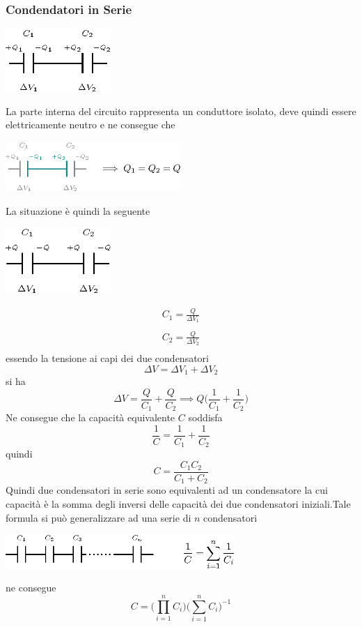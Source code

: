 \documentclass[10pt, letterpaper]{report}
\begin{document}
\subsubsection{Condendatori in Serie}
\begin{center}
    \includegraphics[width=0.3\textwidth]{images/condensatoreSerie1.eps}
\end{center} 
La parte interna del circuito rappresenta un conduttore isolato, deve quindi essere elettricamente neutro e ne consegue che 
\begin{center}
    \includegraphics[width=0.5\textwidth]{images/condensatoreSerie2.eps}
\end{center} 
La situazione è quindi la seguente 
\begin{center}
    \includegraphics[width=0.3\textwidth]{images/condensatoreSerie3.eps}
\end{center} 
$$ \begin{matrix}
    C_1 = \frac{Q}{\Delta V_1}\\ \\
    C_2 = \frac{Q}{\Delta V_2} \\ 
\end{matrix}$$essendo la tensione ai capi dei due condensatori
$$ 
\Delta V = \Delta V_1+\Delta V_2
$$ si ha 
$$ 
 \Delta V=\frac{Q}{C_1}+\frac{Q}{C_2}\implies Q\Big(\frac{1}{C_1}+\frac{1}{C_2}\Big)$$
 Ne consegue che la capacità equivalente $C$ soddisfa 
 $$ \frac{1}{C}=\frac{1}{C_1}+\frac{1}{C_2}$$
 quindi 
 $$ C=\frac{C_1C_2}{C_1+C_2}$$
Quindi due condensatori in serie sono equivalenti ad un condensatore la cui capacità è la somma degli inversi delle capacità dei due condensatori iniziali.\acc  Tale formula si può generalizzare ad una serie di $n$ condensatori\begin{center}
    \includegraphics[width=0.65\textwidth]{images/condensatoreSerie4.eps}
\end{center} 
ne consegue 
$$ C=\Big(\displaystyle  \prod_{i=1}^n C_i\Big)\Big(\displaystyle \sum_{i=1}^n C_i\Big)^{-1}$$
\end{document}
